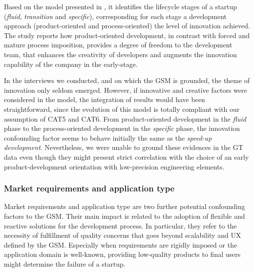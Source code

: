 \documentclass[10pt,journal,letterpaper,compsoc]{IEEEtran}
\begin{document}
Based on the model presented in \cite{Heitlager2007}, it identifies the 
lifecycle stages of a startup (\textit{fluid}, \textit{transition} and 
\textit{specific}), corresponding for each stage a development approach 
(product-oriented and process-oriented) the level of innovation achieved. The 
study reports how product-oriented development, in contrast with forced and 
mature process imposition, provides a degree of freedom to the development team, 
that enhances the creativity of developers and augments the innovation 
capability of the company in the early-stage.


In the interviews we conducted, and on which the GSM is grounded, the theme of 
innovation only seldom emerged. However, if innovative and creative factors were 
considered in the model, the integration of results would have been 
straightforward, since the evolution of this model is totally compliant with our 
assumption of CAT5 and CAT6. %
From product-oriented development in the \textit{fluid} phase to the 
process-oriented development in the \textit{specific} phase, the innovation 
confounding factor seems to behave initially the same as the \textit{speed-up 
development}.%
Nevertheless, we were unable to ground these evidences in the GT data even 
though they might present strict correlation %
with the choice of an early product-development orientation with low-precision 
engineering elements.

\subsubsection{Market requirements and application type} 
Market requirements \cite{Coleman2007} and application type \cite{Sutton2000, 
Coleman2008, Coleman2008a} are two further potential confounding factors to the 
GSM. Their main impact is related to the adoption of flexible and reactive 
solutions for the development process. In particular, they refer to the 
necessity of fulfillment of quality concerns that goes beyond scalability and UX 
defined by the GSM. Especially when requirements are rigidly imposed or the 
application domain is well-known, providing low-quality products to final users 
might determine the failure of a startup. 
\end{document}
